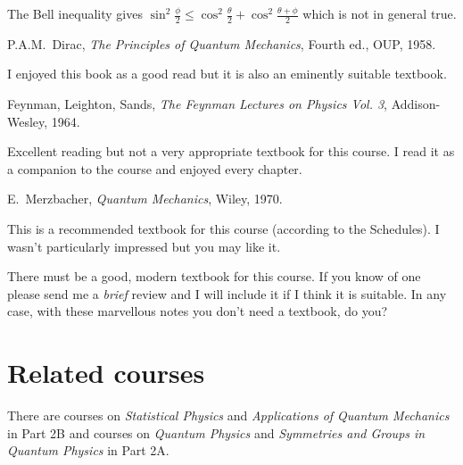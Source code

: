 \documentclass{notes}
\begin{document}
The Bell inequality gives
$\sin^2 \tfrac{\phi}{2} \le \cos^2 \tfrac{\theta}{2} + \cos^2 \tfrac{\theta
+ \phi}{2}$ which is not in general true.

\backmatter

\begin{thebibliography}{9}

 P.A.M.~Dirac, \emph{The Principles of Quantum
    Mechanics}, Fourth ed., OUP, 1958.
  
  {\sffamily \small I enjoyed this book as a good read but it is also
    an eminently suitable textbook. }
  
 Feynman, Leighton, Sands, \emph{The Feynman Lectures
    on Physics Vol. 3}, Addison-Wesley, 1964.
  
  {\sffamily \small Excellent reading but not a very appropriate
    textbook for this course.  I read it as a companion to the course
    and enjoyed every chapter. }
  
 E.~Merzbacher, \emph{Quantum Mechanics}, Wiley,
  1970.
  
  {\sffamily \small This is a recommended textbook for this course
    (according to the Schedules).  I wasn't particularly impressed but
    you may like it.}
\end{thebibliography}

There must be a good, modern textbook for this course.  If you know of
one please send me a \emph{brief} review and I will include it if I
think it is suitable.  In any case, with these marvellous notes
you don't need a textbook, do you?

\section*{Related courses}

There are courses on \emph{Statistical Physics} and \emph{Applications
of Quantum Mechanics} in Part 2B and courses on \emph{Quantum Physics}
and \emph{Symmetries and Groups in Quantum Physics} in Part 2A.
\end{document}
